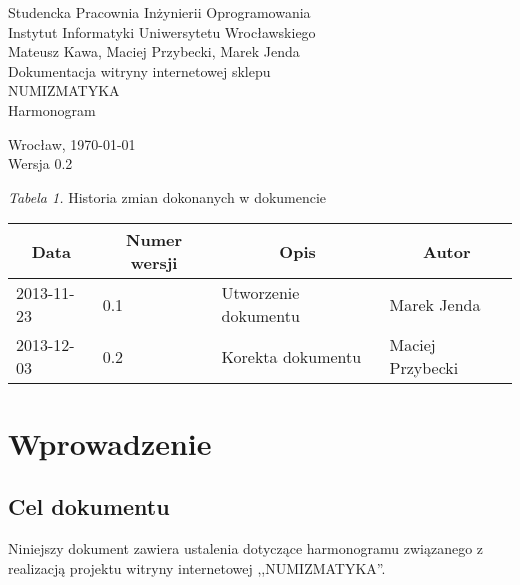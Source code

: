 \documentclass [11pt, a4paper, leqno]	{article}	%
\begin{document}

\begin{center}
	\thispagestyle{empty} 							%
	{\large Studencka Pracownia Inżynierii Oprogramowania} 		\\ [0.5cm]
	{\large Instytut Informatyki Uniwersytetu Wrocławskiego} 	\\ [6.0cm]

	{\large Mateusz Kawa, Maciej Przybecki, Marek Jenda} 		\\ [1.5cm]

	{\huge Dokumentacja witryny internetowej sklepu} 			\\ [0.5cm]
	{\huge NUMIZMATYKA} 										\\ [1.5cm]

	{\large Harmonogram} 										\\ [0.5cm]

	\vfill
	
	{\large Wrocław, \today}									\\ [0.5cm]
	{\large Wersja 0.2}
\end{center}

\newpage


\textit{Tabela 1.} Historia zmian dokonanych w dokumencie

\begin{center}
	\begin{tabular}{| l | l | l | l |}
		\hline
		\multicolumn{1}{|c|}{Data} & 
		\multicolumn{1}{|c|}{Numer wersji} &  
		\multicolumn{1}{|c|}{Opis} &
		\multicolumn{1}{|c|}{Autor} \\ \hline \hline
		2013-11-23 & 0.1 & Utworzenie dokumentu & Marek Jenda \\ \hline
		2013-12-03 & 0.2 & Korekta dokumentu  & Maciej Przybecki \\ \hline
	\end{tabular}
\end{center}

\newpage


\tableofcontents

\newpage

\section{Wprowadzenie}

\subsection{Cel dokumentu}
\noindent
Niniejszy dokument zawiera ustalenia dotyczące harmonogramu związanego z realizacją projektu witryny internetowej ,,NUMIZMATYKA''.
\end{document}
